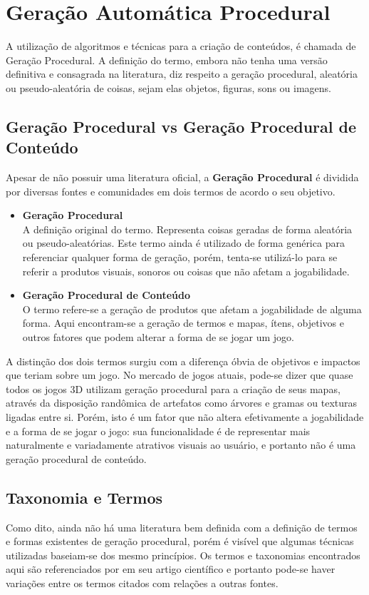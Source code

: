 \section{Geração Automática Procedural}
	A utilização de algoritmos e técnicas para a criação de conteúdos, é chamada de Geração Procedural. A definição do termo, embora não tenha uma versão definitiva e consagrada na literatura, diz respeito a geração procedural, aleatória ou pseudo-aleatória de coisas, sejam elas objetos, figuras, sons ou imagens. 
\subsection{Geração Procedural vs Geração Procedural de Conteúdo}
	Apesar de não possuir uma literatura oficial, a \textbf{Geração Procedural} é dividida por diversas fontes e comunidades \cite{pcgwiki} em dois termos de acordo o seu objetivo. 
	\begin{itemize}
		\item \textbf{Geração Procedural}\\
			A definição original do termo. Representa coisas geradas de forma aleatória ou pseudo-aleatórias. Este termo ainda é utilizado de forma genérica para referenciar qualquer forma de geração, porém, tenta-se utilizá-lo para se referir a produtos visuais, sonoros ou coisas que não afetam a jogabilidade.
		\item \textbf{Geração Procedural de Conteúdo}\\
			O termo refere-se a geração de produtos que afetam a jogabilidade de alguma forma. Aqui encontram-se a geração de termos e mapas, ítens, objetivos e outros fatores que podem alterar a forma de se jogar um jogo.

	\end{itemize}
	A distinção dos dois termos surgiu com a diferença óbvia de objetivos e impactos que teriam sobre um jogo. No mercado de jogos atuais, pode-se dizer que quase todos os jogos 3D utilizam geração procedural para a criação de seus mapas, através da disposição randômica de artefatos como árvores e gramas ou texturas ligadas entre si. Porém, isto é um fator que não altera efetivamente a jogabilidade e a forma de se jogar o jogo: sua funcionalidade é de representar mais naturalmente e variadamente atrativos visuais ao usuário, e portanto não é uma geração procedural de conteúdo. 
	
\subsection{Taxonomia e Termos}
	Como dito, ainda não há uma literatura bem definida com a definição de termos e formas existentes de geração procedural, porém é visível que algumas técnicas utilizadas baseiam-se dos mesmo princípios.	Os termos e taxonomias encontrados aqui são referenciados por \cite{TaxonomySearchBasePCG} em seu artigo científico e portanto pode-se haver variações entre os termos citados com relações a outras fontes. 
	

